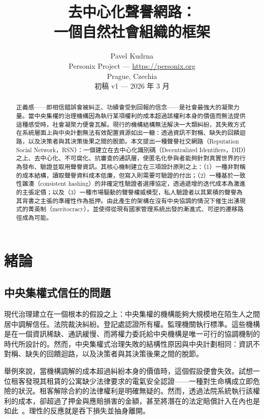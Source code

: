 \documentclass[11pt,a4paper,twocolumn]{article}
\title{\textbf{去中心化聲譽網路：\\一個自然社會組織的框架}}
\author{Pavel Kudrna\\Personix Project --- \url{https://personix.org}\\Prague, Czechia\\初稿 v1 --- 2026 年 3 月}
\date{}
\begin{document}
\maketitle

\begin{abstract}
正義感——即相信錯誤會被糾正、功績會受到回報的信念——是社會最強大的凝聚力量。當中央集權的治理機構因為執行某項權利的成本超過該權利本身的價值而無法提供這種感受時，社會凝聚力便會瓦解。現行的機構結構無法解決一大類糾紛，其失敗方式在系統層面上與中央計劃無法有效配置資源如出一轍：透過資訊不對稱、缺失的回饋迴路，以及決策者與其決策後果之間的脫節。本文提出一種聲譽社交網路（Reputation Social Network，RSN）：一個建立在去中心化識別碼（Decentralized Identifiers，DID）之上、去中心化、不可腐化、抗審查的通訊層，使匿名化參與者能夠針對真實世界的行為發布、驗證並取用聲譽資訊。其核心機制建立在三項設計原則之上：（1）一種非對稱的成本結構，讀取聲譽資料成本低廉，但寫入則需要可驗證的付出；（2）一種基於一致性雜湊（consistent hashing）的非確定性驗證者選擇協定，透過遞增的迭代成本為激進的主張定價；以及（3）一種市場驅動的聲譽權威模型，私人驗證者以其累積的聲譽為其背書之主張的準確性作為抵押。由此產生的架構在沒有中央協調的情況下催生出湧現式的菁英制（meritocracy），並使得從現有國家管理系統出發的漸進式、可逆的遷移路徑成為可能。
\end{abstract}

\section{緒論}

\subsection{中央集權式信任的問題}

現代治理建立在一個根本的假設之上：中央集權的機構能夠大規模地在陌生人之間居中調解信任。法院裁決糾紛。登記處認證所有權。監理機關執行標準。這些機構是在一個資訊稀缺、通訊緩慢、而將權力委託給中央機構是唯一可行的協調機制的時代所設計的。然而，中央集權式治理失敗的結構性原因與中央計劃相同：資訊不對稱、缺失的回饋迴路，以及決策者與其決策後果之間的脫節。

舉例來說，當機構調解的成本超過糾紛本身的價值時，這個假設便會失效。試想一位租客發現其租賃的公寓缺少法律要求的電氣安全認證——一種對生命構成立即危險的狀況。租客解除合約的法律權利是明確無疑的。然而，透過法院系統執行該權利的成本，卻超過了押金與應賠損害的金額，甚至將潛在的法定賠償計入在內也是如此~\cite{czcourtfees}。理性的反應就是吞下損失並抽身離開。
\end{document}
